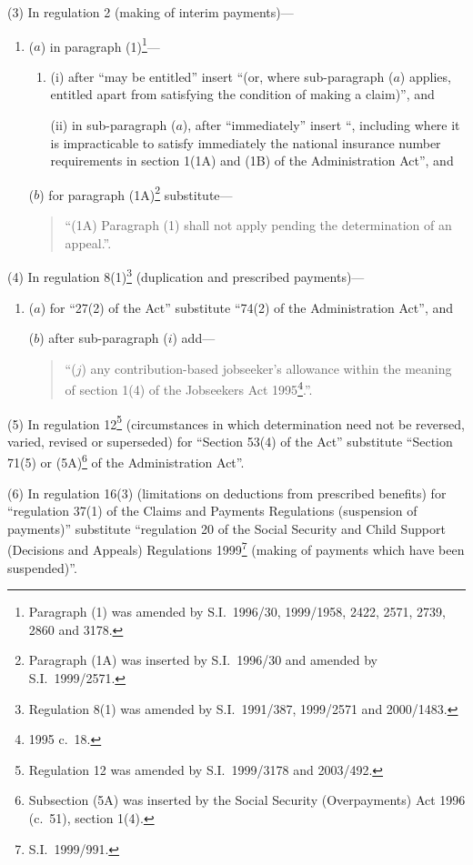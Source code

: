 \documentclass[12pt,a4paper]{article}
\begin{document}
(3) In regulation 2 (making of interim payments)—
\begin{enumerate}\item[]
($a$) in paragraph (1)\footnote{Paragraph (1) was amended by S.I.\ 1996/30, 1999/1958, 2422, 2571, 2739, 2860 and 3178.}—
\begin{enumerate}\item[]
(i) after “may be entitled” insert “(or, where sub-paragraph ($a$)  applies, entitled apart from satisfying the condition of making a claim)”, and

(ii) in sub-paragraph ($a$), after “immediately” insert “, including where it is impracticable to satisfy immediately the national insurance number requirements in section 1(1A) and (1B) of the Administration Act”, and
\end{enumerate}

($b$) for paragraph (1A)\footnote{Paragraph (1A) was inserted by S.I.\ 1996/30 and amended by S.I.\ 1999/2571.} substitute—
\begin{quotation}
“(1A) Paragraph (1) shall not apply pending the determination of an appeal.”.
\end{quotation}
\end{enumerate}

(4) In regulation 8(1)\footnote{Regulation 8(1) was amended by S.I.\ 1991/387, 1999/2571 and 2000/1483.} (duplication and prescribed payments)—
\begin{enumerate}\item[]
($a$) for “27(2) of the Act” substitute “74(2) of the Administration Act”, and

($b$) after sub-paragraph ($i$)  add—
\begin{quotation}
“($j$) any contribution-based jobseeker’s allowance within the meaning of section 1(4) of the Jobseekers Act 1995\footnote{1995 c.\ 18.}.”.
\end{quotation}
\end{enumerate}

(5) In regulation 12\footnote{Regulation 12 was amended by S.I.\ 1999/3178 and 2003/492.} (circumstances in which determination need not be reversed, varied, revised or superseded) for “Section 53(4) of the Act” substitute “Section 71(5) or (5A)\footnote{Subsection (5A) was inserted by the Social Security (Overpayments) Act 1996 (c.\ 51), section 1(4).} of the Administration Act”.

(6) In regulation 16(3) (limitations on deductions from prescribed benefits) for “regulation 37(1) of the Claims and Payments Regulations (suspension of payments)” substitute “regulation 20 of the Social Security and Child Support (Decisions and Appeals) Regulations 1999\footnote{S.I.\ 1999/991.} (making of payments which have been suspended)”.
\end{document}

